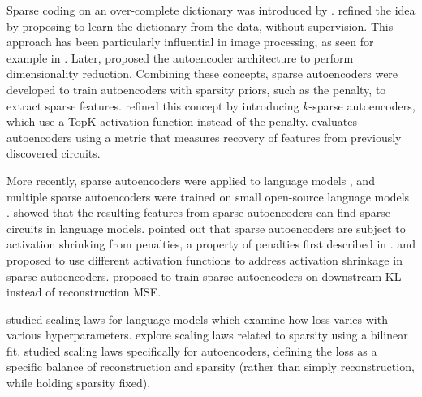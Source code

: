 Sparse coding on an over-complete dictionary was introduced by \cite{mallat1993matching}.
\cite{olshausen1996emergence} refined the idea by proposing to learn the dictionary from the data, without supervision. This approach has been particularly influential in image processing, as seen for example in \citep{mairal2014sparse}.
Later, \cite{hinton2006reducing} proposed the autoencoder architecture to perform dimensionality reduction. 
Combining these concepts, sparse autoencoders were developed \citep{lee2007sparse,le2012building,konda2014zero} to train autoencoders with sparsity priors, such as the \Lone penalty, to extract sparse features.
\cite{makhzani2013k} refined this concept by introducing $k$-sparse autoencoders, which use a TopK activation function instead of the \Lone penalty. \cite{makelov2024principled} evaluates autoencoders using a metric that measures recovery of features from previously discovered circuits.


More recently, sparse autoencoders were applied to language models \citep{yun2021transformer, sharkey2022taking, bricken2023monosemanticity, cunningham2023sparse},
and multiple sparse autoencoders were trained on small open-source language models \citep{marks2023some, bloom2024open, mossing2024tdb}.
\cite{marks2024sparse} showed that the resulting features from sparse autoencoders can find sparse circuits in language models.
\cite{wright2024addressing} pointed out that sparse autoencoders are subject to activation shrinking from \Lone penalties, a property of \Lone penalties first described in \cite{tibshirani1996regression}.
\cite{taggart2024prolu} and \cite{rajamanoharan2024improving} proposed to use different activation functions to address activation shrinkage in sparse autoencoders.  \citet{braun2024identifying} proposed to train sparse autoencoders on downstream KL instead of reconstruction MSE.

\cite{kaplan2020scaling} studied scaling laws for language models which examine how loss varies with various hyperparameters.  \cite{clark2022unified} explore scaling laws related to sparsity using a bilinear fit.
\cite{lindsey2024scaling} studied scaling laws specifically for autoencoders, defining the loss as a specific balance of reconstruction and sparsity (rather than simply reconstruction, while holding sparsity fixed).






